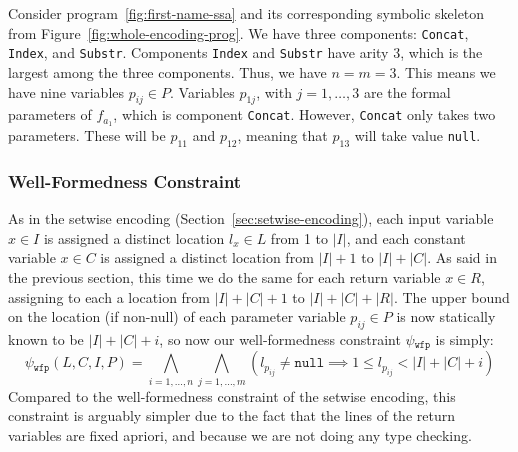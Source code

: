 \begin{example}
  Consider program~\ref{fig:first-name-ssa} and its corresponding symbolic
  skeleton from Figure~\ref{fig:whole-encoding-prog}.
  We have three components: \lstinline{Concat}, \lstinline{Index}, and
  \lstinline{Substr}.
  Components \lstinline{Index} and \lstinline{Substr} have arity 3,
  which is the largest among the three components.
  Thus, we have $n = m = 3$. This means we have nine variables $p_{ij} \in P$.
  Variables $p_{1j}$, with $j = 1, \ldots, 3$ are the formal parameters of
  $f_{a_1}$, which is component \lstinline{Concat}.
  However, \lstinline{Concat} only takes two parameters.
  These will be $p_{11}$ and $p_{12}$, meaning that $p_{13}$ will take value
  \lstinline{null}.
\end{example}

\subsubsection{Well-Formedness Constraint}
\label{sec:whole-well-formedness-constraint}

As in the setwise encoding (Section~\ref{sec:setwise-encoding}), each input
variable $x \in I$ is assigned a distinct location $l_x \in L$ from 1 to $|I|$,
and each constant variable $x \in C$ is assigned a distinct location from $|I| +
1$ to $|I| + |C|$.
As said in the previous section, this time we do the same for each return
variable $x \in R$, assigning to each a location from $|I| + |C| + 1$ to
$|I| + |C| + |R|$.
The upper bound on the location (if non-null) of each parameter variable $p_{ij}
\in P$ is now statically known to be $|I| + |C| + i$, so now our well-formedness
constraint $\psi{}_{\mathtt{wfp}}$ is simply:
%
\[
  \psi{}_{\mathtt{wfp}}(L,C,I,P) =
  \bigwedge_{i = 1, \ldots, n}\bigwedge_{j = 1, \ldots, m}
  (l_{p_{ij}} \neq \mathtt{null} \implies 1 \leq l_{p_{ij}} < |I| + |C| + i)
\]
%
\noindent
Compared to the well-formedness constraint of the setwise encoding, this
constraint is arguably simpler due to the fact that the lines of the return
variables are fixed apriori, and because we are not doing any type checking.

